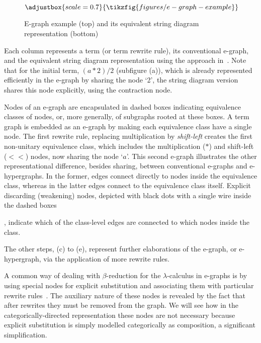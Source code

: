 \documentclass[]{IEEEtran}
\begin{document}
\begin{figure*}
\[
\adjustbox{scale=0.7}{
\tikzfig{figures/e-graph-example}
}
\]
\caption{E-graph example (top) and its equivalent string diagram representation (bottom)}
\label{fig:e-graph-example}
\end{figure*}

Each column represents a term (or term rewrite rule), its conventional e-graph, and the equivalent string diagram representation using the approach in~\cite{ghica2024equivalencehypergraphsegraphsmonoidal}. 
Note that for the initial term, $(a*2)/2$ (subfigure (a)), which is already represented efficiently in the e-graph by sharing the node `2', the string diagram version shares this node explicitly, using the contraction node.

Nodes of an e-graph are encapsulated in dashed boxes indicating equivalence classes of nodes, or, more generally, of subgraphs rooted at these boxes.
A term graph is embedded as an e-graph by making each equivalence class have a single node.
The first rewrite rule, replacing multiplication by \emph{shift-left} creates the first non-unitary equivalence class, which includes the multiplication ($*$) and shift-left ($<\!\!<$) nodes,  now sharing the node `$a$'.
This second e-graph illustrates the other representational difference, besides sharing, between conventional e-graphs and e-hypergraphs.
In the former, edges connect directly to nodes inside the equivalence class, whereas in the latter edges connect to the equivalence class itself.
Explicit discarding (weakening) nodes, depicted with black dots with a single wire inside the dashed boxes 

, indicate which of the class-level edges are connected to which nodes inside the class.

The other steps, (c) to (e), represent further elaborations of the e-graph, or e-hypergraph, via the application of more rewrite rules.

A common way of dealing with $\beta$-reduction for the $\lambda$-calculus in e-graphs is by using special nodes for explicit substitution and associating them with particular rewrite rules~\cite{EggPaper,koehler2022sketchguided}.
The auxiliary nature of these nodes is revealed by the fact that after rewrites they must be removed from the graph. 
We will see how in the categorically-directed representation these nodes are not necessary because explicit substitution is simply modelled categorically as composition, a significant simplification.
\end{document}
